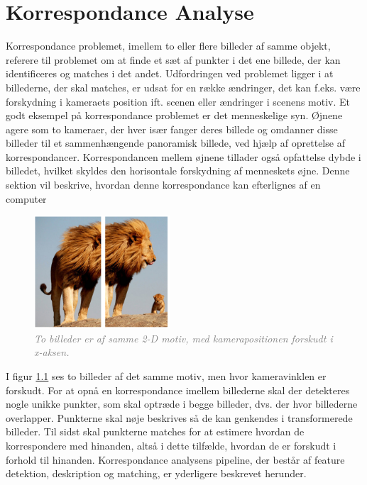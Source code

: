 \chapter{Korrespondance Analyse} \label{sec:Kor}
Korrespondance problemet, imellem to eller flere billeder af samme objekt, referere til problemet om at finde et sæt af punkter i det ene billede, der kan identificeres og matches i det andet.
Udfordringen ved problemet ligger i at billederne, der skal matches, er udsat for en række ændringer, det kan f.eks. være forskydning i kameraets position ift. scenen eller  ændringer i scenens motiv. Et godt eksempel på korrespondance problemet er det menneskelige syn. Øjnene agere som to kameraer, der hver især fanger deres billede og omdanner disse billeder til et sammenhængende panoramisk billede, ved hjælp af oprettelse af korrespondancer. Korrespondancen mellem øjnene tillader også opfattelse dybde i billedet, hvilket skyldes den horisontale forskydning af menneskets øjne. Denne sektion vil beskrive, hvordan denne korrespondance kan efterlignes af en computer
\begin{figure}[H]
    \centering
    \includegraphics[width=0.45\textwidth]{fig/3.png}
     \vspace{-1em}
    \begin{center}    
       \caption{\textcolor{gray}{\footnotesize \textit{To billeder er af samme 2-D motiv, med kamerapositionen forskudt i x-aksen.}}}
    \label{fig:1}
     \end{center}
     \vspace{-2.5em}
  \end{figure} \noindent
I figur \ref{fig:1} ses to billeder af det samme motiv, men hvor kameravinklen er forskudt. For at opnå en korrespondance imellem billederne skal der detekteres nogle unikke punkter, som skal optræde i begge billeder, dvs. der hvor billederne overlapper. Punkterne skal nøje beskrives så de kan genkendes i transformerede billeder. Til sidst skal punkterne matches for at estimere hvordan de korrespondere med hinanden, altså i dette tilfælde, hvordan de er forskudt i forhold til hinanden. Korrespondance analysens pipeline, der består af feature detektion, deskription og matching, er yderligere beskrevet herunder.
